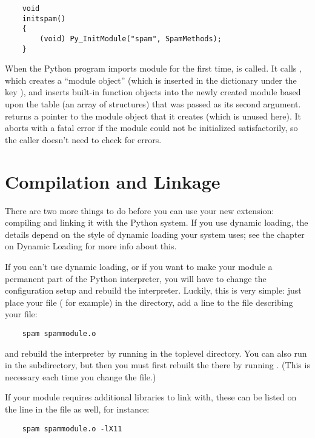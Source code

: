 \documentclass[twoside,openright]{report}
\begin{document}
\bcode\begin{verbatim}
    void
    initspam()
    {
        (void) Py_InitModule("spam", SpamMethods);
    }
\end{verbatim}\ecode
%
When the Python program imports module  for the first time,
 is called.  It calls , which
creates a ``module object'' (which is inserted in the dictionary
 under the key ), and inserts built-in
function objects into the newly created module based upon the table
(an array of  structures) that was passed as its
second argument.   returns a pointer to the
module object that it creates (which is unused here).  It aborts with
a fatal error if the module could not be initialized satisfactorily,
so the caller doesn't need to check for errors.


\section{Compilation and Linkage}

There are two more things to do before you can use your new extension:
compiling and linking it with the Python system.  If you use dynamic
loading, the details depend on the style of dynamic loading your
system uses; see the chapter on Dynamic Loading for more info about
this.

If you can't use dynamic loading, or if you want to make your module a
permanent part of the Python interpreter, you will have to change the
configuration setup and rebuild the interpreter.  Luckily, this is
very simple: just place your file ( for example) in
the  directory, add a line to the file
 describing your file:

\bcode\begin{verbatim}
    spam spammodule.o
\end{verbatim}\ecode
%
and rebuild the interpreter by running  in the toplevel
directory.  You can also run  in the 
subdirectory, but then you must first rebuilt the 
there by running .  (This is necessary each time
you change the  file.)

If your module requires additional libraries to link with, these can
be listed on the line in the  file as well, for instance:

\bcode\begin{verbatim}
    spam spammodule.o -lX11
\end{verbatim}\ecode
%
\end{document}
